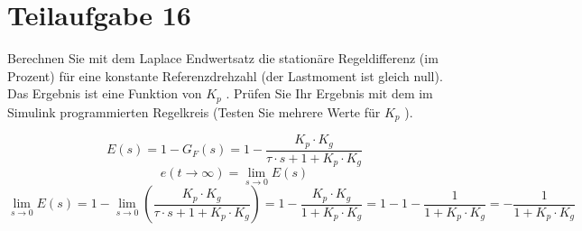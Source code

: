 \section{Teilaufgabe 16}
\begin{aufgabe}
    Berechnen Sie mit dem Laplace Endwertsatz die stationäre Regeldifferenz 
    (im Prozent) für eine konstante Referenzdrehzahl (der Lastmoment ist 
    gleich null).  Das Ergebnis ist eine Funktion von $K_p$ . Prüfen Sie Ihr 
    Ergebnis mit dem im Simulink programmierten Regelkreis (Testen Sie mehrere 
    Werte für $K_p$ ).
\end{aufgabe}
\[ E(s) = 1 - G_F(s) 
    = 1 - \frac{K_p \cdot K_g}{\tau \cdot s + 1 + K_p \cdot K_g}
\]
\[ e(t \to \infty) = \lim\limits_{s \to 0} E(s) \]
\[ \lim\limits_{s \to 0} E(s)
    = 1 - \lim\limits_{s \to 0}
        \left(\frac{K_p \cdot K_g}{\tau \cdot s + 1 + K_p \cdot K_g}\right)
    = 1 - \frac{K_p \cdot K_g}{1 + K_p \cdot K_g}
    = 1 - 1 - \frac{1}{1 + K_p \cdot K_g}
    = -\frac{1}{1 + K_p \cdot K_g}
\]
